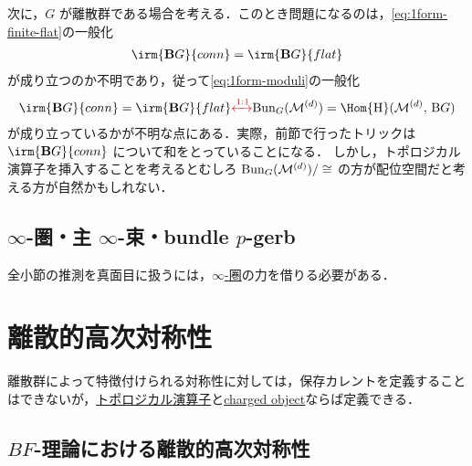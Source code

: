 \documentclass[TQFT_main]{subfiles}
\begin{document}
次に，$G$ が離散群である場合を考える．このとき問題になるのは，\eqref{eq:1form-finite-flat}の一般化
\begin{align}
    \irm{\bm{\mathrm{B}}G}{conn} = \irm{\bm{\mathrm{B}}G}{flat} 
\end{align}
が成り立つのか不明であり，従って\eqref{eq:1form-moduli}の一般化
\begin{align}
    \irm{\bm{\mathrm{B}}G}{conn} = \irm{\bm{\mathrm{B}}G}{flat} \textcolor{red}{\xleftrightarrow{1:1}} \mathrm{Bun}_G (\mfdcal{M}{d}) = \Hom{\mathrm{\bm{H}}} (\mfdcal{M}{d},\, \mathrm{\bm{B}}G)
\end{align}
が成り立っているかが不明な点にある．実際，前節で行ったトリックは $\irm{\bm{\mathrm{B}}G}{conn}$ について和をとっていることになる．
しかし，トポロジカル演算子を挿入することを考えるとむしろ $\mathrm{Bun}_G (\mathcal{M}^{(d)})/\cong$ の方が配位空間だと考える方が自然かもしれない．

\subsection{$\infty$-圏・主 $\infty$-束・bundle $p$-gerb}

全小節の推測を真面目に扱うには，\hyperref[def:infinity-1]{$\infty$-圏}の力を借りる必要がある．

\section{離散的高次対称性}

離散群によって特徴付けられる対称性に対しては，保存カレントを定義することはできないが，\hyperref[def:p-form-sym]{トポロジカル演算子}と\hyperref[def:p-form-sym]{charged object}ならば定義できる．

\subsection{$BF$-理論における離散的高次対称性}
\end{document}
